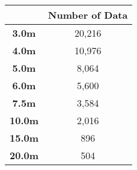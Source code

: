 \begin{tabular}{cc}
\toprule
{} & Number of Data \\
\midrule
\textbf{3.0m } &         20,216 \\
\textbf{4.0m } &         10,976 \\
\textbf{5.0m } &          8,064 \\
\textbf{6.0m } &          5,600 \\
\textbf{7.5m } &          3,584 \\
\textbf{10.0m} &          2,016 \\
\textbf{15.0m} &            896 \\
\textbf{20.0m} &            504 \\
\bottomrule
\end{tabular}
